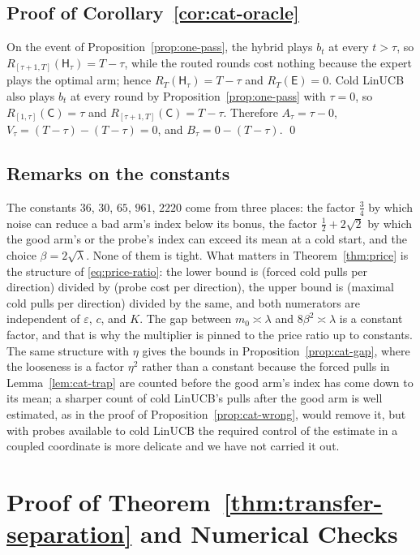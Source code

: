 \documentclass{article}
\theoremstyle{definition}
\theoremstyle{remark}
\newcommand{\eps}{\varepsilon}
\theoremstyle{remark}
\newcommand{\Cold}{\mathsf{C}}
\newcommand{\Exp}{\mathsf{E}}
\newcommand{\Hyb}{\mathsf{H}}
\begin{document}
\subsection{Proof of Corollary~\ref{cor:cat-oracle}}

On the event of Proposition~\ref{prop:one-pass}, the hybrid plays $b_t$ at
every $t>\tau$, so $R_{[\tau+1,T]}(\Hyb_\tau)=T-\tau$, while the routed rounds
cost nothing because the expert plays the optimal arm; hence
$R_T(\Hyb_\tau)=T-\tau$ and $R_T(\Exp)=0$. Cold LinUCB also plays $b_t$ at
every round by Proposition~\ref{prop:one-pass} with $\tau=0$, so
$R_{[1,\tau]}(\Cold)=\tau$ and $R_{[\tau+1,T]}(\Cold)=T-\tau$. Therefore
$A_\tau=\tau-0$, $V_\tau=(T-\tau)-(T-\tau)=0$, and $B_\tau=0-(T-\tau)$. \qed

\subsection{Remarks on the constants}

The constants $36$, $30$, $65$, $961$, $2220$ come from three places: the
factor $\tfrac34$ by which noise can reduce a bad arm's index below its bonus,
the factor $\tfrac12+2\sqrt2$ by which the good arm's or the probe's index can
exceed its mean at a cold start, and the choice $\beta=2\sqrt\lambda$. None of
them is tight. What matters in Theorem~\ref{thm:price} is the structure of
\eqref{eq:price-ratio}: the lower bound is (forced cold pulls per direction)
divided by (probe cost per direction), the upper bound is (maximal cold pulls
per direction) divided by the same, and both numerators are independent of
$\eps$, $c$, and $K$. The gap between $m_0\asymp\lambda$ and $8\beta^2\asymp\lambda$
is a constant factor, and that is why the multiplier is pinned to the price
ratio up to constants. The same structure with $\eta$ gives the bounds in
Proposition~\ref{prop:cat-gap}, where the looseness is a factor $\eta^2$ rather
than a constant because the forced pulls in Lemma~\ref{lem:cat-trap} are
counted before the good arm's index has come down to its mean; a sharper
count of cold LinUCB's pulls after the good arm is well estimated, as in the
proof of Proposition~\ref{prop:cat-wrong}, would remove it, but with probes
available to cold LinUCB the required control of the estimate in a coupled
coordinate is more delicate and we have not carried it out.


\section{Proof of Theorem~\ref{thm:transfer-separation} and Numerical Checks}
\label{app:proof-transfer-sep}
\end{document}
